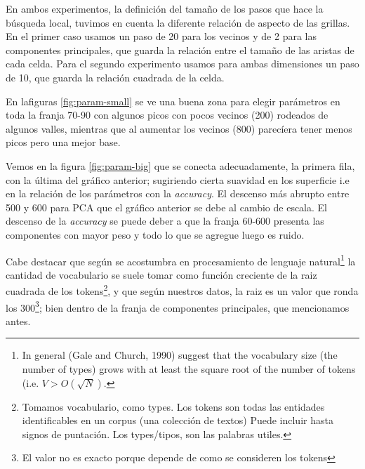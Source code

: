 En ambos experimentos, la definición del tamaño de los pasos que hace
la búsqueda local, tuvimos en cuenta la diferente relación de aspecto
de las grillas. En el primer caso usamos un paso de 20 para los
vecinos y de 2 para las componentes principales, que guarda la
relación entre el tamaño de las aristas de cada celda. Para el segundo
experimento usamos para ambas dimensiones un paso de 10, que guarda la
relación cuadrada de la celda.

En lafiguras \ref{fig:param-small} se ve una buena zona para elegir parámetros en toda la franja 70-90 con algunos picos con pocos vecinos (200) rodeados de algunos valles, mientras que al aumentar los vecinos (800) parecíera tener menos picos pero una mejor base.

Vemos en la figura \ref{fig:param-big} que se conecta adecuadamente,
la primera fila, con la última del gráfico anterior; sugiriendo cierta
suavidad en los superficie i.e en la relación de los parámetros con la
\emph{accuracy}. El descenso más abrupto entre 500 y 600 para PCA que el
gráfico anterior se debe al cambio de escala. El descenso de la
\emph{accuracy} se puede deber a que la franja 60-600 presenta las componentes con mayor peso y todo lo que se agregue luego es ruido.

Cabe destacar que según se acostumbra en procesamiento de
lenguaje\cite{LP} natural\footnote{In general (Gale and Church, 1990)
  suggest that the vocabulary size (the number of types) grows with at
  least the square root of the number of tokens (i.e.
  $V > O(\sqrt{N})$.} la cantidad de vocabulario se suele tomar como
función creciente de la raiz cuadrada de los tokens\footnote{Tomamos
  vocabulario, como types. Los tokens son todas las entidades
  identificables en un corpus (una colección de textos) Puede incluir
  hasta signos de puntación. Los types/tipos, son las palabras
  utiles.}, y que según nuestros datos, la raiz es un valor que ronda
los 300\footnote{El valor no es exacto porque depende de como se
  consideren los tokens}; bien dentro de la franja de componentes
principales, que mencionamos antes.

